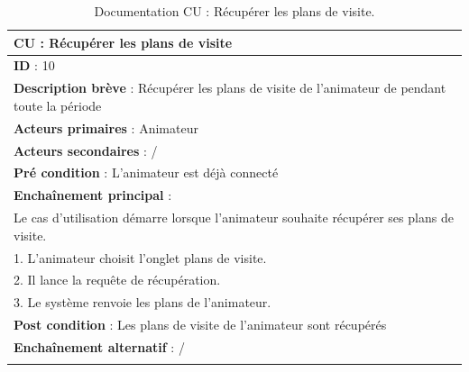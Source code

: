 \renewcommand{\arraystretch}{1.5}
\begin{xltabular}{\linewidth}{|X|}
    \hline
    \textbf{CU} : Récupérer les plans de visite    \\\hline
    \textbf{ID} :  10    \\\hline
    \textbf{Description brève} : Récupérer les plans de visite de l'animateur de pendant toute la période     \\\hline
    \textbf{Acteurs primaires} :   Animateur   \\\hline
    \textbf{Acteurs secondaires} : /     \\\hline
    \textbf{Pré condition} : L'animateur est déjà connecté   \\\hline
    \textbf{Enchaînement principal} : \\
    Le cas d'utilisation démarre lorsque l'animateur souhaite récupérer ses plans de visite.\\
    1. L'animateur choisit l'onglet plans de visite.\\
    2. Il lance la requête de récupération.\\
    3. Le système renvoie les plans de l'animateur.
    \\\hline
    \textbf{Post condition} :  Les plans de visite de l'animateur sont récupérés    \\\hline
    \textbf{Enchaînement alternatif} :  /   \\\hline
    
    \caption{Documentation CU : Récupérer les plans de visite.}
    \label{tab:cu-specs4}
\end{xltabular}
\FloatBarrier


